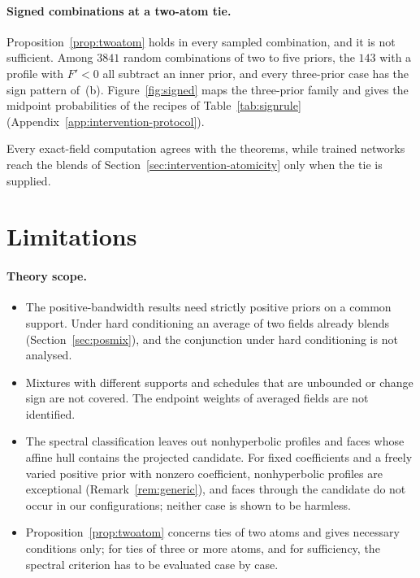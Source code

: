 \documentclass{article} %
\theoremstyle{plain}
\theoremstyle{definition}
\theoremstyle{remark}
\begin{document}
\paragraph{Signed combinations at a two-atom tie.} Proposition~\ref{prop:twoatom} holds in every
sampled combination, and it is not sufficient. Among $3841$ random combinations of two to five priors, the $143$ with a
profile with $F'<0$ all subtract an inner prior, and every three-prior case has the sign pattern
of~(b). Figure~\ref{fig:signed} maps the three-prior family and gives the midpoint probabilities
of the recipes of Table~\ref{tab:signrule} (Appendix~\ref{app:intervention-protocol}).

Every exact-field computation agrees with the theorems, while trained networks reach
the blends of Section~\ref{sec:intervention-atomicity} only when the tie is supplied.

\section{Limitations}
\label{sec:limitations}

\paragraph{Theory scope.}
\begin{itemize}[leftmargin=1.5em,itemsep=1pt,topsep=2pt]
\item The positive-bandwidth results need strictly positive priors on a common support. Under hard
  conditioning an average of two fields already blends (Section~\ref{sec:posmix}), and the
  conjunction under hard conditioning is not analysed.
\item Mixtures with different supports and schedules that are unbounded or change sign are not
  covered. The endpoint weights of averaged fields are not identified.
\item The spectral classification leaves out nonhyperbolic profiles and faces whose affine hull
  contains the projected candidate. For fixed coefficients and a freely varied positive prior with
  nonzero coefficient, nonhyperbolic profiles are exceptional (Remark~\ref{rem:generic}), and faces
  through the candidate do not occur in our configurations; neither case is shown to be harmless.
\item Proposition~\ref{prop:twoatom} concerns ties of two atoms and gives necessary conditions
  only; for ties of three or more atoms, and for sufficiency, the spectral criterion has to be
  evaluated case by case.
\end{itemize}
\end{document}
